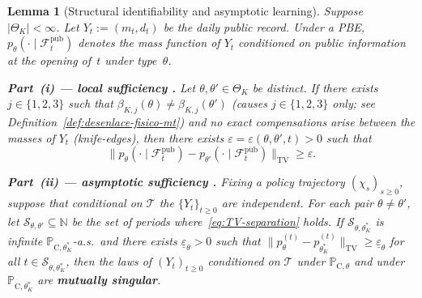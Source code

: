 \documentclass[ecta,nameyear,final,supplement]{econsocart}
\numberwithin{equation}{section}
\numberwithin{table}{section}
\newtheorem{lemma}[theorem]{Lemma}
\theoremstyle{definition}
\newcommand{\ProbC}[1]{\mathbb{P}_{\mathrm{C},#1}}
\begin{document}
\bigskip

\begin{lemma}[Structural identifiability and asymptotic learning]
\label{lem:hazard-separation}
Suppose $|\Theta_K|<\infty$. Let $Y_t:=(m_t,d_t)$ be the daily public record.
Under a PBE, $p_\theta(\cdot\mid\mathcal{F}_t^{\mathrm{pub}})$ denotes the
mass function of $Y_t$ conditioned on public information at the opening of~$t$
under type~$\theta$.

\smallskip
\noindent\textbf{Part~(i) --- local sufficiency
\citep{Cox1972,Bradburn2003}.}
Let $\theta,\theta'\in\Theta_K$ be distinct. If there exists $j\in\{1,2,3\}$ such that
$\beta_{K,j}(\theta)\neq\beta_{K,j}(\theta')$ (causes $j\in\{1,2,3\}$ only; see
Definition~\ref{def:desenlace-fisico-mt}) and no exact compensations arise
between the masses of $Y_t$ (\emph{knife-edges}),
then there exists $\varepsilon=\varepsilon(\theta,\theta',t)>0$ such that
\begin{equation}
\label{eq:TV-separation}
\bigl\|p_\theta(\cdot\mid\mathcal{F}_t^{\mathrm{pub}})
-p_{\theta'}(\cdot\mid\mathcal{F}_{t}^{\mathrm{pub}})\bigr\|_{\mathrm{TV}}
\ge\varepsilon.
\end{equation}

\smallskip
\noindent\textbf{Part~(ii) --- asymptotic sufficiency
\citep{Kakutani1948,Shiryaev2019Probability}.}
Fixing a policy trajectory $(\chi_s)_{s\ge 0}$, suppose that
conditional on $\mathcal{T}$ the $\{Y_t\}_{t\ge 0}$ are independent. For
each pair $\theta\neq\theta'$, let $\mathcal{S}_{\theta,\theta'}\subseteq\mathbb{N}$
be the set of periods where~\eqref{eq:TV-separation} holds. If
$\mathcal{S}_{\theta,\theta_K^\ast}$ is infinite $\ProbC{\theta_K^\ast}$-a.s.\
and there exists $\underline\varepsilon_\theta>0$ such that
$\|p_\theta^{(t)}-p_{\theta_K^\ast}^{(t)}\|_{\mathrm{TV}}
\ge\underline\varepsilon_\theta$ for all $t\in\mathcal{S}_{\theta,\theta_K^\ast}$,
then the laws of $(Y_t)_{t\ge 0}$ conditioned on $\mathcal{T}$ under
$\ProbC{\theta}$ and under $\ProbC{\theta_K^\ast}$ are
\textbf{mutually singular}.
\end{lemma}
\end{document}
